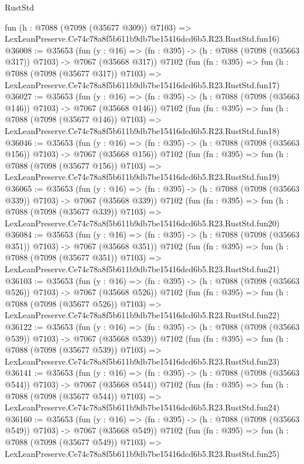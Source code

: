 \begin{lexlean}{RustStd}
\begin{coremodule}
    fun (h : @7088 (@7098 (@35677 @309)) @7103) =>
    LexLeanPreserve.Ce74c78a8f5b611b9db7be15416dcd6b5.R23.RustStd.fun16)
@36008 := @35653
    (fun (y : @16) => (fn : @395) -> (h : @7088 (@7098 (@35663 @317)) @7103) -> @7067 (@35668 @317))
    @7102
    (fun (fn : @395) =>
    fun (h : @7088 (@7098 (@35677 @317)) @7103) =>
    LexLeanPreserve.Ce74c78a8f5b611b9db7be15416dcd6b5.R23.RustStd.fun17)
@36027 := @35653
    (fun (y : @16) => (fn : @395) -> (h : @7088 (@7098 (@35663 @146)) @7103) -> @7067 (@35668 @146))
    @7102
    (fun (fn : @395) =>
    fun (h : @7088 (@7098 (@35677 @146)) @7103) =>
    LexLeanPreserve.Ce74c78a8f5b611b9db7be15416dcd6b5.R23.RustStd.fun18)
@36046 := @35653
    (fun (y : @16) => (fn : @395) -> (h : @7088 (@7098 (@35663 @156)) @7103) -> @7067 (@35668 @156))
    @7102
    (fun (fn : @395) =>
    fun (h : @7088 (@7098 (@35677 @156)) @7103) =>
    LexLeanPreserve.Ce74c78a8f5b611b9db7be15416dcd6b5.R23.RustStd.fun19)
@36065 := @35653
    (fun (y : @16) => (fn : @395) -> (h : @7088 (@7098 (@35663 @339)) @7103) -> @7067 (@35668 @339))
    @7102
    (fun (fn : @395) =>
    fun (h : @7088 (@7098 (@35677 @339)) @7103) =>
    LexLeanPreserve.Ce74c78a8f5b611b9db7be15416dcd6b5.R23.RustStd.fun20)
@36084 := @35653
    (fun (y : @16) => (fn : @395) -> (h : @7088 (@7098 (@35663 @351)) @7103) -> @7067 (@35668 @351))
    @7102
    (fun (fn : @395) =>
    fun (h : @7088 (@7098 (@35677 @351)) @7103) =>
    LexLeanPreserve.Ce74c78a8f5b611b9db7be15416dcd6b5.R23.RustStd.fun21)
@36103 := @35653
    (fun (y : @16) => (fn : @395) -> (h : @7088 (@7098 (@35663 @526)) @7103) -> @7067 (@35668 @526))
    @7102
    (fun (fn : @395) =>
    fun (h : @7088 (@7098 (@35677 @526)) @7103) =>
    LexLeanPreserve.Ce74c78a8f5b611b9db7be15416dcd6b5.R23.RustStd.fun22)
@36122 := @35653
    (fun (y : @16) => (fn : @395) -> (h : @7088 (@7098 (@35663 @539)) @7103) -> @7067 (@35668 @539))
    @7102
    (fun (fn : @395) =>
    fun (h : @7088 (@7098 (@35677 @539)) @7103) =>
    LexLeanPreserve.Ce74c78a8f5b611b9db7be15416dcd6b5.R23.RustStd.fun23)
@36141 := @35653
    (fun (y : @16) => (fn : @395) -> (h : @7088 (@7098 (@35663 @544)) @7103) -> @7067 (@35668 @544))
    @7102
    (fun (fn : @395) =>
    fun (h : @7088 (@7098 (@35677 @544)) @7103) =>
    LexLeanPreserve.Ce74c78a8f5b611b9db7be15416dcd6b5.R23.RustStd.fun24)
@36160 := @35653
    (fun (y : @16) => (fn : @395) -> (h : @7088 (@7098 (@35663 @549)) @7103) -> @7067 (@35668 @549))
    @7102
    (fun (fn : @395) =>
    fun (h : @7088 (@7098 (@35677 @549)) @7103) =>
    LexLeanPreserve.Ce74c78a8f5b611b9db7be15416dcd6b5.R23.RustStd.fun25)

\end{coremodule}
\end{lexlean}
